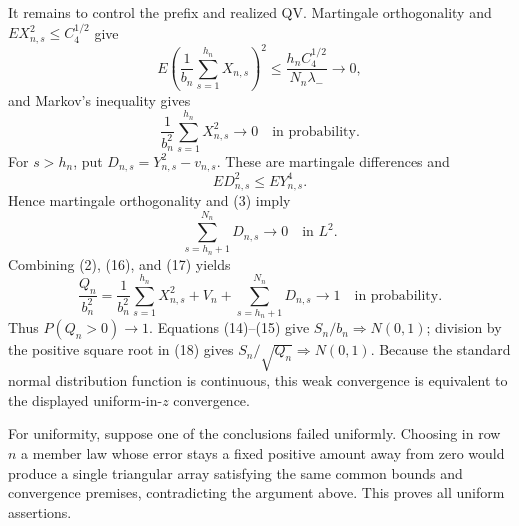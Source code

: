 It remains to control the prefix and realized QV.  Martingale orthogonality and \(E X_{n,s}^2\le C_4^{1/2}\) give
\[
E\left(\frac1{b_n}\sum_{s=1}^{h_n}X_{n,s}\right)^2
\le\frac{h_nC_4^{1/2}}{N_n\lambda_-}\longrightarrow0,
\tag{15}
\]
and Markov's inequality gives
\[
\frac1{b_n^2}\sum_{s=1}^{h_n}X_{n,s}^2\longrightarrow0
\quad\text{in probability}.
\tag{16}
\]
For \(s>h_n\), put \(D_{n,s}=Y_{n,s}^2-v_{n,s}\).  These are martingale differences and
\[
E D_{n,s}^2\le E Y_{n,s}^4.
\]
Hence martingale orthogonality and (3) imply
\[
\sum_{s=h_n+1}^{N_n}D_{n,s}\longrightarrow0
\quad\text{in }L^2.
\tag{17}
\]
Combining (2), (16), and (17) yields
\[
\frac{Q_n}{b_n^2}
=\frac1{b_n^2}\sum_{s=1}^{h_n}X_{n,s}^2+V_n
+\sum_{s=h_n+1}^{N_n}D_{n,s}\longrightarrow1
\quad\text{in probability}.
\tag{18}
\]
Thus \(P(Q_n>0)\to1\).  Equations (14)--(15) give \(S_n/b_n\Rightarrow N(0,1)\); division by the positive square root in (18) gives \(S_n/\sqrt{Q_n}\Rightarrow N(0,1)\).  Because the standard normal distribution function is continuous, this weak convergence is equivalent to the displayed uniform-in-\(z\) convergence.

For uniformity, suppose one of the conclusions failed uniformly.  Choosing in row \(n\) a member law whose error stays a fixed positive amount away from zero would produce a single triangular array satisfying the same common bounds and convergence premises, contradicting the argument above.  This proves all uniform assertions.